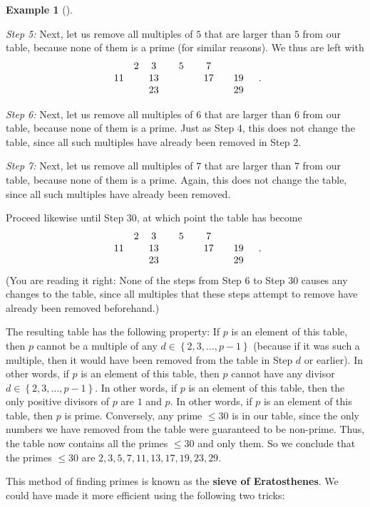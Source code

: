 \documentclass[numbers=enddot,12pt,final,onecolumn,notitlepage]{scrartcl}%
\numberwithin{exer}{subsection}
\theoremstyle{definition}
\newtheorem{exam}[theo]{Example}
\newenvironment{example}[1][]
{\begin{exam}[#1]\begin{leftbar}}
{\end{leftbar}\end{exam}}
\begin{document}
\begin{example}
\textit{Step 5:} Next, let us remove all multiples of $5$ that are larger than
$5$ from our table, because none of them is a prime (for similar reasons). We
thus are left with%
\[%
\begin{array}
[c]{cccccccccc}
& 2 & 3 &  & 5 &  & 7 &  &  & \\
11 &  & 13 &  &  &  & 17 &  & 19 & \\
&  & 23 &  &  &  &  &  & 29 &
\end{array}
.
\]


\textit{Step 6:} Next, let us remove all multiples of $6$ that are larger than
$6$ from our table, because none of them is a prime. Just as Step 4, this does
not change the table, since all such multiples have already been removed in
Step 2.

\textit{Step 7:} Next, let us remove all multiples of $7$ that are larger than
$7$ from our table, because none of them is a prime. Again, this does not
change the table, since all such multiples have already been removed.

Proceed likewise until Step 30, at which point the table has become%
\[%
\begin{array}
[c]{cccccccccc}
& 2 & 3 &  & 5 &  & 7 &  &  & \\
11 &  & 13 &  &  &  & 17 &  & 19 & \\
&  & 23 &  &  &  &  &  & 29 &
\end{array}
.
\]
(You are reading it right: None of the steps from Step 6 to Step 30 causes any
changes to the table, since all multiples that these steps attempt to remove
have already been removed beforehand.)

The resulting table has the following property: If $p$ is an element of this
table, then $p$ cannot be a multiple of any $d\in\left\{  2,3,\ldots
,p-1\right\}  $ (because if it was such a multiple, then it would have been
removed from the table in Step $d$ or earlier). In other words, if $p$ is an
element of this table, then $p$ cannot have any divisor $d\in\left\{
2,3,\ldots,p-1\right\}  $. In other words, if $p$ is an element of this table,
then the only positive divisors of $p$ are $1$ and $p$. In other words, if $p$
is an element of this table, then $p$ is prime. Conversely, any prime $\leq30$
is in our table, since the only numbers we have removed from the table were
guaranteed to be non-prime. Thus, the table now contains all the primes
$\leq30$ and only them. So we conclude that the primes $\leq30$ are
$2,3,5,7,11,13,17,19,23,29$.

This method of finding primes is known as the \textbf{sieve of Eratosthenes}.
We could have made it more efficient using the following two tricks:


\end{example}
\end{document}
